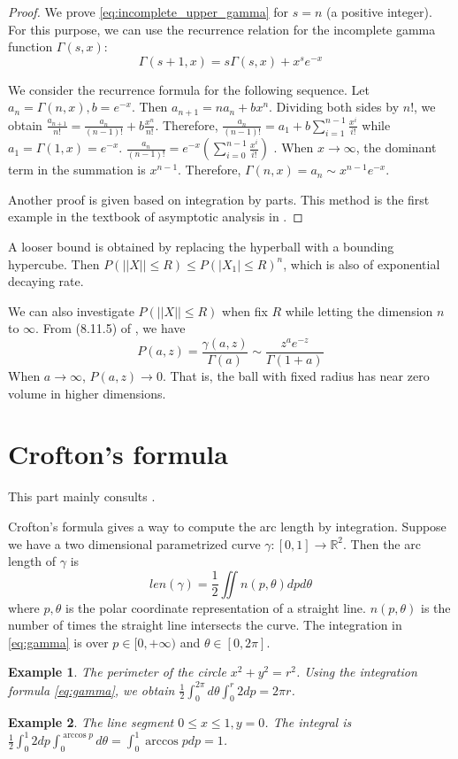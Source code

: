 \documentclass{article}
\newtheorem{example}{Example}
\begin{document}
\begin{proof}
    We prove \eqref{eq:incomplete_upper_gamma}
    for $s=n$ (a positive integer).
For this purpose,
we can use the recurrence relation for the
incomplete gamma function $\Gamma(s,x)$:
\begin{equation}
    \Gamma(s+1, x)
    = s\Gamma(s, x) + x^s e^{-x}
\end{equation}

We consider the recurrence formula for the
following sequence. Let $a_{n}=\Gamma(n, x),
b=e^{-x}$.
Then $a_{n+1} = n a_n + bx^n$.
Dividing both sides by $n!$, we obtain
$\frac{a_{n+1}}{n!} =
\frac{a_n}{(n-1)!} + b\frac{x^n}{n!}$.
Therefore, $\frac{a_n}{(n-1)!} = a_1 + b\sum_{i=1}^{n-1}
\frac{x^i}{i!}$ while $a_1 = \Gamma(1, x)
=e^{-x}$.
$\frac{a_n}{(n-1)!} = e^{-x}
(\sum_{i=0}^{n-1} \frac{x^i}{i!})$
.
When $x\to \infty$, the dominant term
in the summation is $x^{n-1}$. Therefore,
$\Gamma(n,x) = a_n \sim x^{n-1} e^{-x}$.

Another proof is given based on integration by parts.
This method is the first example in the textbook of
asymptotic analysis in \cite{murray2012asymptotic}.
\end{proof}

A looser bound is obtained by replacing the hyperball
with a bounding hypercube. Then
$P(||X||\leq R) \leq P(|X_1|\leq R)^n$, which is also of
exponential decaying rate.

We can also investigate $P(||X||\leq R) $
when fix $R$ while letting the dimension $n$ to $\infty$.
From (8.11.5) of \cite{nist}, we have
\begin{equation}
    P(a,z) = \frac{\gamma(a,z)}{\Gamma(a)} \sim \frac{z^a e^{-z}}{\Gamma(1+a)}
\end{equation}
When $a\to \infty$, $P(a,z) \to 0$. That is, the ball with fixed radius
has near zero volume in higher dimensions.
\section{Crofton's formula}
This part mainly consults \cite{crofton}.

Crofton's formula gives a way to compute the arc length
by integration. Suppose we have a two dimensional
parametrized curve $\gamma: [0, 1] \to \mathbb{R}^2$.
Then the arc length of $\gamma$ is
\begin{equation}\label{eq:gamma}
    len(\gamma) = \frac{1}{2}\iint n(p, \theta)
    dp d\theta
\end{equation}
where $p, \theta$ is the polar coordinate representation
of a straight line. $n(p, \theta)$ is the number of times the 
straight line intersects the curve. The integration
in \eqref{eq:gamma} is over $p\in [0, +\infty)$
and $\theta \in [0, 2\pi]$.
\begin{example}
    The perimeter of the circle $x^2+y^2=r^2$.
    Using the integration formula \eqref{eq:gamma},
    we obtain $\frac{1}{2}\int_{0}^{2\pi} d\theta \int_0^r 2 dp=2\pi r$.
\end{example}
\begin{example}
    The line segment $0\leq x \leq 1, y=0$.
    The integral is $\frac{1}{2}\int_0^1 2 dp
    \int_0^{\arccos p} d\theta =
    \int_0^1 \arccos p dp=1$.
\end{example}
\end{document}
